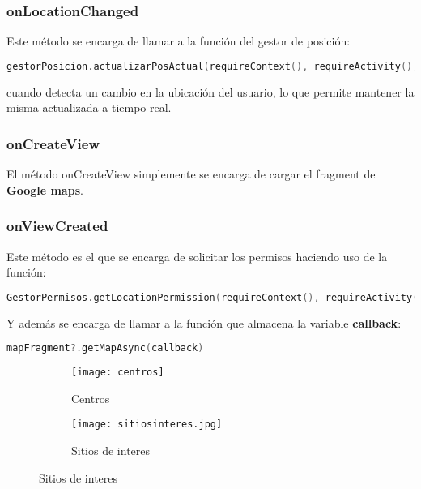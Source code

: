 \subsubsection{onLocationChanged}
Este método se encarga de llamar a la función del gestor de posición:

\begin{lstlisting}[language=Kotlin]
gestorPosicion.actualizarPosActual(requireContext(), requireActivity(), it)
\end{lstlisting}

cuando detecta un cambio en la ubicación del usuario, lo que permite mantener la misma actualizada a tiempo real.

\subsubsection{onCreateView}
El método onCreateView simplemente se encarga de cargar el fragment de \textbf{Google maps}.

\subsubsection{onViewCreated}
Este método es el que se encarga de solicitar los permisos haciendo uso de la función:

\begin{lstlisting}[language=Kotlin]
GestorPermisos.getLocationPermission(requireContext(), requireActivity())]
\end{lstlisting}

Y además se encarga de llamar a la función que almacena la variable \textbf{callback}:

\begin{lstlisting}[language=Kotlin]
mapFragment?.getMapAsync(callback)
\end{lstlisting}

\begin{figure}[H]
\begin{subfigure}{0.5\textwidth}
  \centering
  \texttt{[image: centros]}
  \caption{Centros}
  \label{fig:sub-first}
\end{subfigure}
\begin{subfigure}{0.5\textwidth}
  \centering
  \texttt{[image: sitiosinteres.jpg]}
  \caption{Sitios de interes}
  \label{fig:sub-second}
\end{subfigure}
\end{figure}

